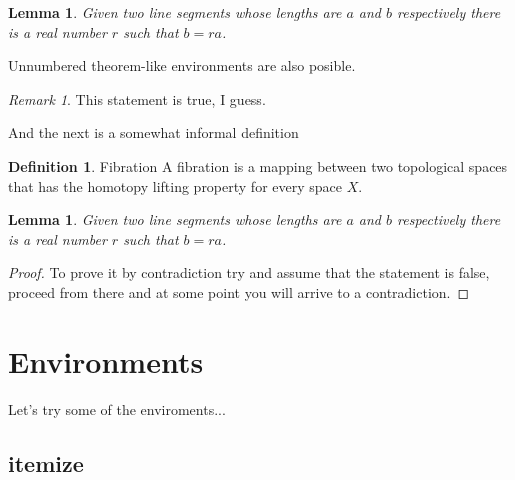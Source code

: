 \documentclass[11pt,a4paper]{report}
\newtheorem{lemma}[theorem]{Lemma}
\theoremstyle{remark}
\newtheorem*{remark}{Remark}
\theoremstyle{definition}
\newtheorem{definition}{Definition}[section]
\begin{document}
			\begin{lemma}
				Given two line segments whose lengths are $a$ and $b$ respectively there is a 
				real number $r$ such that $b=ra$.
			\end{lemma}
			
			Unnumbered theorem-like environments are also posible.
			
			\begin{remark}
				This statement is true, I guess.
			\end{remark}
			
			And the next is a somewhat informal definition
			
			\theoremstyle{definition}
			\begin{definition}{Fibration}
				A fibration is a mapping between two topological spaces that has the homotopy lifting property for every space $X$.
			\end{definition}
			
			\begin{lemma}
				Given two line segments whose lengths are $a$ and $b$ respectively there 
				is a real number $r$ such that $b=ra$.
			\end{lemma}
			
			\begin{proof}
				To prove it by contradiction try and assume that the statement is false,
				proceed from there and at some point you will arrive to a contradiction.
			\end{proof}
		
		\section*{Environments}
		
			\noindent
			Let's try some of the enviroments...
						
			\subsection*{itemize}
			
\end{document}
